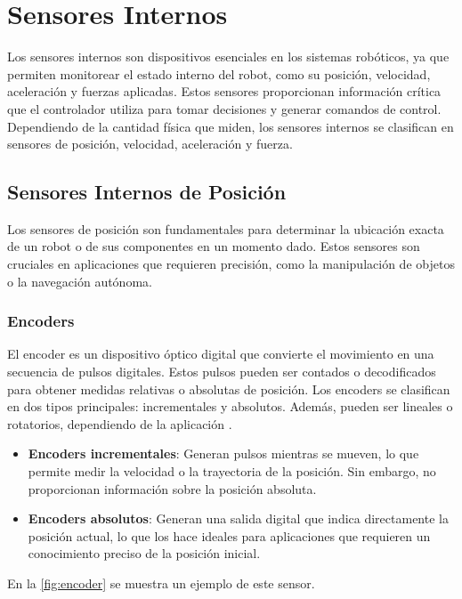 

\section{Sensores Internos}

Los sensores internos son dispositivos esenciales en los sistemas robóticos, ya que permiten monitorear el estado interno del robot, como su posición, velocidad, aceleración y fuerzas aplicadas. Estos sensores proporcionan información crítica que el controlador utiliza para tomar decisiones y generar comandos de control. Dependiendo de la cantidad física que miden, los sensores internos se clasifican en sensores de posición, velocidad, aceleración y fuerza.

\subsection{Sensores Internos de Posición}

Los sensores de posición son fundamentales para determinar la ubicación exacta de un robot o de sus componentes en un momento dado. Estos sensores son cruciales en aplicaciones que requieren precisión, como la manipulación de objetos o la navegación autónoma.

\subsubsection{Encoders}
El encoder es un dispositivo óptico digital que convierte el movimiento en una secuencia de pulsos digitales. Estos pulsos pueden ser contados o decodificados para obtener medidas relativas o absolutas de posición. Los encoders se clasifican en dos tipos principales: incrementales y absolutos. Además, pueden ser lineales o rotatorios, dependiendo de la aplicación \cite{OMCH}.

\begin{itemize}
	\item \textbf{Encoders incrementales}: Generan pulsos mientras se mueven, lo que permite medir la velocidad o la trayectoria de la posición. Sin embargo, no proporcionan información sobre la posición absoluta.
	\item \textbf{Encoders absolutos}: Generan una salida digital que indica directamente la posición actual, lo que los hace ideales para aplicaciones que requieren un conocimiento preciso de la posición inicial.
\end{itemize}

En la \autoref{fig:encoder} se muestra un ejemplo de este sensor.

